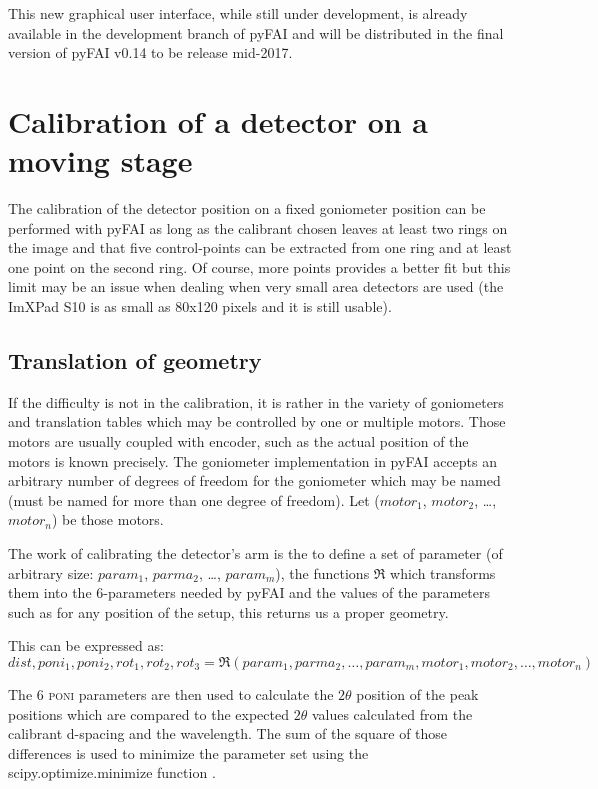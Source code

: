 \documentclass[preprint]{iucr}              %
\begin{document}
This new graphical user interface, while still under development, is already
available in the development branch of pyFAI and will be distributed in the
final version of pyFAI v0.14 to be release mid-2017.

\section{Calibration of a detector on a moving stage}

The calibration of the detector position on a fixed goniometer position can be
performed with pyFAI as long as the calibrant chosen leaves at least two rings
on the image and that five control-points can be extracted from one ring and
at least one point on the second ring. 
Of course, more points provides a better fit but this limit may be an issue
when dealing when very small area detectors are used (the ImXPad S10 is as
small as 80x120 pixels and it is still usable).

\subsection{Translation of geometry}

If the difficulty is not in the calibration, it is  rather in the variety of
goniometers and translation tables which may be controlled by one or multiple
motors.
Those motors are usually coupled with encoder, such as the actual position of
the motors is known precisely.
The goniometer implementation in pyFAI accepts an
arbitrary number of degrees of freedom for the goniometer which may be named 
(must be named for more than one degree of freedom). 
Let ($motor_1$, $motor_2$, \ldots, $motor_n$) be those motors. 

The work of calibrating the detector's arm is the to define a set of parameter
(of arbitrary size: $param_1$, $parma_2$, \ldots, $param_m$), the functions
$\Re$ which transforms them into the 6-parameters needed by pyFAI and the values
of the parameters such as for any position of the setup, this returns us a
proper geometry.

This can be expressed as:
$$
dist, poni_1, poni_2, rot_1, rot_2, rot_3 = \Re(param_1, parma_2, \ldots,
param_m, motor_1, motor_2, \ldots, motor_n) 
$$

The 6 \textsc{poni} parameters are then used to calculate the $2\theta$
position of the peak positions which are compared to the expected $2\theta$
values calculated from the calibrant d-spacing and the wavelength. 
The sum of the square of those differences is used to minimize the parameter set
using the scipy.optimize.minimize function \cite{scipy}.
\end{document}
